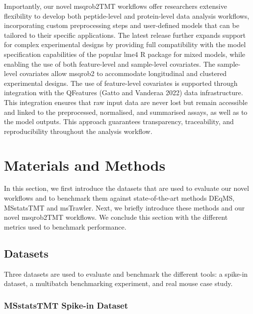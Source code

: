 \documentclass[
  letterpaper,
  DIV=11,
  numbers=noendperiod]{scrartcl}
\begin{document}
Importantly, our novel msqrob2TMT workflows offer researchers extensive
flexibility to develop both peptide-level and protein-level data
analysis workflows, incorporating custom preprocessing steps and
user-defined models that can be tailored to their specific applications.
The latest release further expands support for complex experimental
designs by providing full compatibility with the model specification
capabilities of the popular lme4 R package for mixed models, while
enabling the use of both feature-level and sample-level covariates. The
sample-level covariates allow msqrob2 to accommodate longitudinal and
clustered experimental designs. The use of feature-level covariates is
supported through integration with the QFeatures (Gatto and Vanderaa
2022) data infrastructure. This integration ensures that raw input data
are never lost but remain accessible and linked to the preprocessed,
normalised, and summarised assays, as well as to the model outputs. This
approach guarantees transparency, traceability, and reproducibility
throughout the analysis workflow.

\section{Materials and Methods}

In this section, we first introduce the datasets that are used to
evaluate our novel workflows and to benchmark them against
state-of-the-art methods DEqMS, MSstatsTMT and msTrawler. Next, we
briefly introduce these methods and our novel msqrob2TMT workflows. We
conclude this section with the different metrics used to benchmark
performance.

\subsection{Datasets}

Three datasets are used to evaluate and benchmark the different tools: a
spike-in dataset, a multibatch benchmarking experiment, and real mouse
case study.

\subsubsection{MSstatsTMT Spike-in Dataset}
\end{document}
